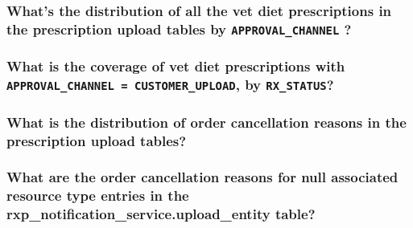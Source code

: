 


\clearpage
\subsubsection{What's the distribution of all the vet diet prescriptions in the prescription upload tables by \texttt{APPROVAL\_CHANNEL} ?}
\label{subsec:upload-vet-diet-approval-channels}



\clearpage
\subsubsection{What is the coverage of vet diet prescriptions with \texttt{APPROVAL\_CHANNEL = CUSTOMER\_UPLOAD}, by \texttt{RX\_STATUS}?}
\label{subsec:cmpu-approved-prescription-upload-coverage}



\clearpage
\subsubsection{What is the distribution of order cancellation reasons in the prescription upload tables?}
\label{subsec:source-order-cancellation-reasons}



\subsubsection{What are the order cancellation reasons for null associated resource type entries in the rxp\_notification\_service.\texorpdfstring{\allowbreak}{}upload\_entity table?}
\label{subsec:null-resource-upload-order-cancellation-reasons}


\clearpage

